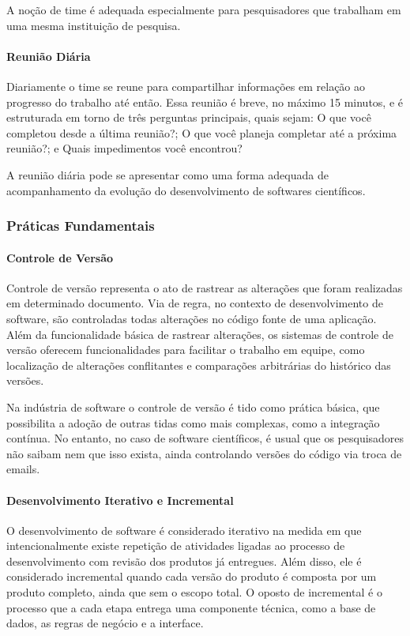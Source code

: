 \documentclass[
	article,			%
	11pt,				%
	oneside,			%
	a4paper,			%
	english,			%
	brazil,				%
	sumario=tradicional
	]{abntex2}
\begin{document}
A noção de time é adequada especialmente para pesquisadores que trabalham em uma mesma instituição de pesquisa.

\paragraph*{Reunião Diária}
Diariamente o time se reune para compartilhar informações em relação ao progresso do trabalho até então. Essa reunião é breve, no máximo 15 minutos, e é estruturada em torno de três perguntas principais, quais sejam: O que você completou desde a última reunião?; O que você planeja completar até a próxima reunião?; e Quais impedimentos você encontrou?

A reunião diária pode se apresentar como uma forma adequada de acompanhamento da evolução do desenvolvimento de softwares científicos.

\subsubsection*{Práticas Fundamentais}

\paragraph*{Controle de Versão}
Controle de versão representa o ato de rastrear as alterações que foram realizadas em determinado documento. Via de regra, no contexto de desenvolvimento de software, são controladas todas alterações no código fonte de uma aplicação. Além da funcionalidade básica de rastrear alterações, os sistemas de controle de versão oferecem funcionalidades para facilitar o trabalho em equipe, como localização de alterações conflitantes e comparações arbitrárias do histórico das versões.

Na indústria de software o controle de versão é tido como prática básica, que possibilita a adoção de outras tidas como mais complexas, como a integração contínua. No entanto, no caso de software científicos, é usual que os pesquisadores não saibam nem que isso exista, ainda controlando versões do código via troca de emails.

\paragraph*{Desenvolvimento Iterativo e Incremental}
O desenvolvimento de software é considerado iterativo na medida em que intencionalmente existe repetição de atividades ligadas ao processo de desenvolvimento com revisão dos produtos já entregues. Além disso, ele é considerado incremental quando cada versão do produto é composta por um produto completo, ainda que sem o escopo total. O oposto de incremental é o processo que a cada etapa entrega uma componente técnica, como a base de dados, as regras de negócio e a interface.
\end{document}
